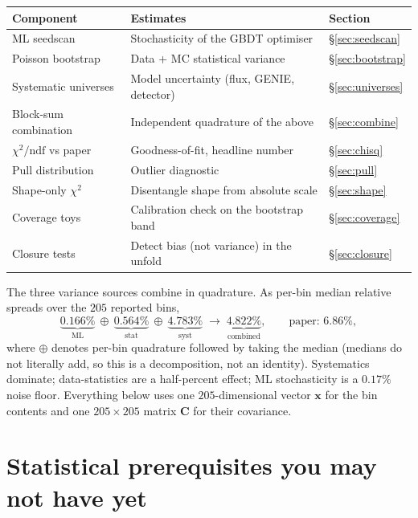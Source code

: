\documentclass[12pt]{article}
\newcommand{\stat}{\text{stat}}
\newcommand{\syst}{\text{syst}}
\newcommand{\ML}{\text{ML}}
\begin{document}
\begin{center}
\begin{tabular}{@{}lll@{}}
\toprule
Component & Estimates & Section \\
\midrule
ML seedscan & Stochasticity of the GBDT optimiser & \S\ref{sec:seedscan} \\
Poisson bootstrap & Data + MC statistical variance & \S\ref{sec:bootstrap} \\
Systematic universes & Model uncertainty (flux, GENIE, detector) & \S\ref{sec:universes} \\
Block-sum combination & Independent quadrature of the above & \S\ref{sec:combine} \\
\midrule
$\chi^{2}/\mathrm{ndf}$ vs paper & Goodness-of-fit, headline number & \S\ref{sec:chisq} \\
Pull distribution & Outlier diagnostic & \S\ref{sec:pull} \\
Shape-only $\chi^{2}$ & Disentangle shape from absolute scale & \S\ref{sec:shape} \\
Coverage toys & Calibration check on the bootstrap band & \S\ref{sec:coverage} \\
Closure tests & Detect bias (not variance) in the unfold & \S\ref{sec:closure} \\
\bottomrule
\end{tabular}
\end{center}

The three variance sources combine in quadrature. As per-bin median
relative spreads over the $205$ reported bins,
\begin{equation}
\underbrace{0.166\%}_{\ML}\ \oplus\
\underbrace{0.564\%}_{\stat}\ \oplus\
\underbrace{4.783\%}_{\syst}
\;\longrightarrow\;
\underbrace{4.822\%}_{\text{combined}},
\qquad
\text{paper: } 6.86\%,
\end{equation}
where $\oplus$ denotes per-bin quadrature followed by taking the
median (medians do not literally add, so this is a decomposition, not
an identity). Systematics dominate; data-statistics are a half-percent
effect; ML stochasticity is a $0.17\%$ noise floor. Everything below
uses one $205$-dimensional vector $\mathbf{x}$ for the bin contents
and one $205 \times 205$ matrix $\mathbf{C}$ for their covariance.

\section{Statistical prerequisites you may not have yet}
\label{sec:prereq}
\end{document}
